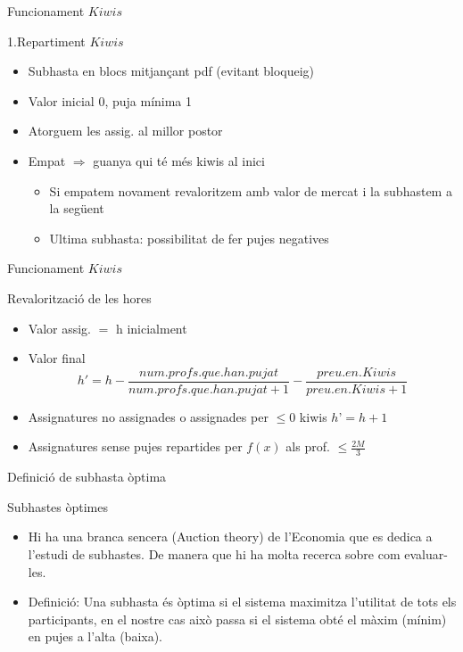 \documentclass[twocolumn]{beamer}
\begin{document}
\begin{frame}{Funcionament $Kiwis$}
\begin{block}{1.Repartiment $Kiwis$}
\begin{itemize}
	\item Subhasta en blocs mitjançant pdf (evitant bloqueig)
	\item Valor inicial 0, puja mínima 1
	\item Atorguem les assig. al millor postor
	\item Empat $\Rightarrow$ guanya qui té més kiwis al inici
	\begin{itemize}
		\item Si empatem novament revaloritzem amb valor de mercat i la subhastem a la següent
		\item Ultima subhasta: possibilitat de fer pujes negatives
	\end{itemize}
\end{itemize}
\end{block}
\end{frame}


\begin{frame}{Funcionament $Kiwis$}
\begin{block}{Revalorització de les hores}
\begin{itemize}
\item Valor assig. $=$ h inicialment
\item Valor final $$h'=h-\frac{num.profs.que.han.pujat}{num.profs.que.han.pujat+1}-\frac{preu.en.Kiwis}{preu.en.Kiwis+1}$$
\item Assignatures no assignades o assignades per $\leq0$ kiwis  $h’=h+1$
\item Assignatures sense pujes repartides per $f(x)$ als prof. $\leq \frac{2M}{3}$
\end{itemize}
\end{block}
\end{frame}

\begin{frame}{Definició de subhasta òptima}

\begin{block}{Subhastes òptimes}
	\begin{itemize}
		\item Hi ha una branca sencera (Auction theory) de l'Economia que es dedica a l'estudi de subhastes. De manera que hi ha molta recerca sobre com evaluar-les.
		\item Definició: Una subhasta és òptima si el sistema maximitza l'utilitat de tots els participants, en el nostre cas això passa si el sistema obté el màxim (mínim) en pujes a l'alta (baixa).
	\end{itemize}
\end{block}
\end{frame}
\end{document}
